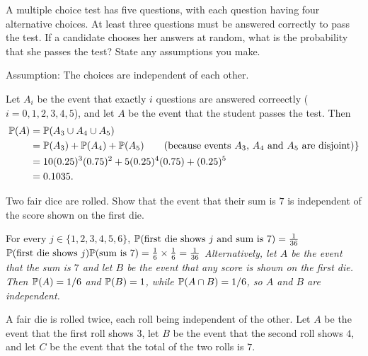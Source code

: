 \begin{exercise}
\begin{questions}
\question
A multiple choice test has five questions, with each question having four alternative
choices. At least three questions must be answered correctly to pass the test.
If a candidate chooses her answers at random, what is the probability that she passes the test? State any assumptions you make.
\begin{answer}
Assumption: The choices are independent of each other. 
\par
Let $A_i$ be the event that exactly $i$ questions are answered correectly ($i=0,1,2,3,4,5$), and let $A$ be the event that the student passes the test. Then
\begin{align*}
\mathbb{P}(A) 	
	& = \mathbb{P}(A_3\cup A_4\cup A_5) \\
	& = \mathbb{P}(A_3) + \mathbb{P}(A_4) + \mathbb{P}(A_5) \qquad\text{(because events $A_3$, $A_4$ and $A_5$ are disjoint)} \} \\
	& = 10(0.25)^3(0.75)^2 + 5(0.25)^4(0.75) + (0.25)^5 \\
	& = 0.1035.
\end{align*}
\end{answer}

\question
Two fair dice are rolled. Show that the event that their sum is $7$ is independent of the score shown on the first die.
\begin{answer}
For every $j\in\{1,2,3,4,5,6\}$,
\bit
\it $\mathbb{P}(\text{first die shows $j$ and sum is $7$}) = \frac{1}{36}$
\it $\mathbb{P}(\text{first die shows $j$})\mathbb{P}(\text{sum is $7$}) = \frac{1}{6}\times\frac{1}{6} = \frac{1}{36}$
\eit
Alternatively, let $A$ be the event that the sum is $7$ and let $B$ be the event that any score is shown on the first die. Then $\mathbb{P}(A)=1/6$ and  $\mathbb{P}(B)=1$, while $\mathbb{P}(A\cap B)=1/6$, so $A$ and $B$ are independent.
\end{answer}

\question
A fair die is rolled twice, each roll being independent of the other. Let $A$ be the event that the first roll shows $3$, let $B$ be the event that the second roll shows $4$, and let $C$ be the event that the total of the two rolls is $7$.
\end{questions}
\end{exercise}
